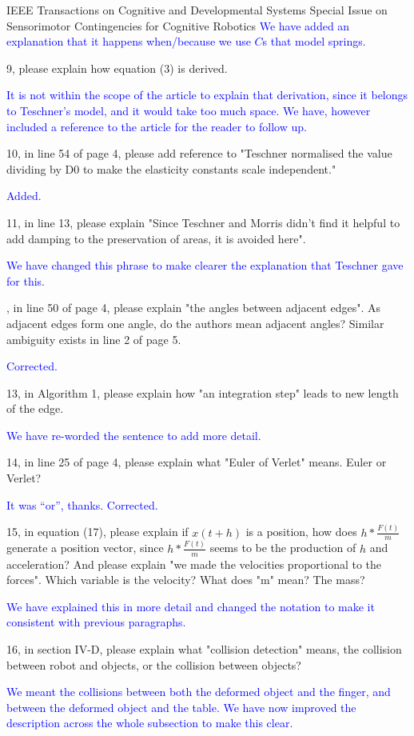 \documentclass[a4paper,12pt]{letter}
\newcommand{\comment}[1]{\textcolor{blue}{#1}}
\begin{document}
\begin{letter}{IEEE Transactions on Cognitive and Developmental Systems\newline
Special Issue on Sensorimotor Contingencies for Cognitive Robotics}
\comment{We have added an explanation that it happens when/because we use $C$s that model springs.}

9, please explain how equation (3) is derived.

\comment{It is not within the scope of the article to explain that derivation, since it belongs to Teschner's model, and it would take too much space. We have, however included a reference to the article for the reader to follow up.}

10, in line 54 of page 4, please add reference to "Teschner normalised the value dividing by D0 to make the elasticity constants scale independent." 

\comment{Added.}

11, in line 13, please explain "Since Teschner and Morris didn’t find it helpful to add damping to the preservation of areas, it is avoided here".

\comment{We have changed this phrase to make clearer the explanation that Teschner gave for this.}

, in line 50 of page 4, please explain "the angles between adjacent edges". As adjacent edges form one angle, do the authors mean adjacent angles? Similar ambiguity exists in line 2 of page 5. 

\comment{Corrected.}

13, in Algorithm 1, please explain how "an integration step" leads to new length of the edge. 

\comment{We have re-worded the sentence to add more detail.}

14, in line 25 of page 4, please explain what "Euler of Verlet" means. Euler or Verlet? 

\comment{It was ``or'', thanks.  Corrected.}

15, in equation (17), please explain if $x(t+h)$ is a position, how does $h*\frac{F(t)}{m}$ generate a position vector, since $h*\frac{F(t)}{m}$ seems to be the production of $h$ and acceleration? And please explain "we made the velocities proportional to the forces". Which variable is the velocity? What does "m" mean? The mass?

\comment{We have explained this in more detail and changed the notation to make it consistent with previous paragraphs.}

16, in section IV-D, please explain what "collision detection" means, the collision between robot and objects, or the collision between objects?

\comment{We meant the collisions between both the deformed object and the finger, and between the deformed object and the table. We have now improved the description across the whole subsection to make this clear.}


\end{letter}
\end{document}
